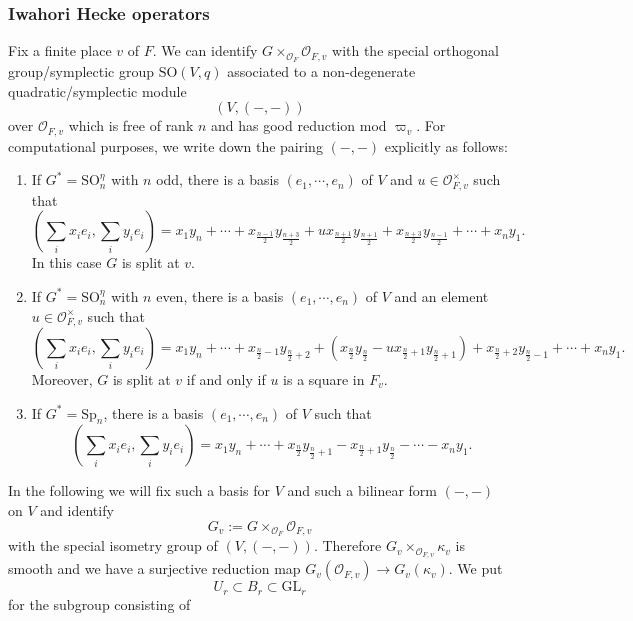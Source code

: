 \documentclass[12pt,oneside,reqno]{amsart}
\theoremstyle{plain}
\begin{document}
	\subsubsection{Iwahori Hecke operators}
	Fix a finite place $v$ of $F$.
	We can identify
	$G\times_{\mathcal{O}_F}\mathcal{O}_{F,v}$
	with the special orthogonal group/symplectic group
	$\mathrm{SO}(V,q)$
	associated to a non-degenerate quadratic/symplectic module
	\[
	(V,(-,-))
	\]
	over
	$\mathcal{O}_{F,v}$ which is free of rank $n$
	and has good reduction mod
	$\varpi_v$.
	For computational purposes,
	we write down the pairing
	$(-,-)$ explicitly as follows:
	\begin{enumerate}
		\item 
		If $G^\ast=\mathrm{SO}_n^\eta$ with $n$ odd,
		there is a basis
		$(e_1,\cdots,e_n)$
		of $V$ and $u\in\mathcal{O}_{F,v}^\times$ such that
		\[
		(\sum_ix_ie_i,\sum_iy_ie_i)
		=
		x_1y_n+\cdots+x_{\frac{n-1}{2}}y_{\frac{n+3}{2}}+ux_{\frac{n+1}{2}}y_{\frac{n+1}{2}}+x_{\frac{n+3}{2}}y_{\frac{n-1}{2}}+\cdots+x_ny_1.
		\]
		In this case
		$G$ is split at $v$.
		
		
		
		
		
		\item 
		If $G^\ast=\mathrm{SO}_n^\eta$ with $n$ even,
		there is a basis
		$(e_1,\cdots,e_n)$
		of $V$ and an element $u\in\mathcal{O}_{F,v}^\times$ such that
		\[
		(\sum_ix_ie_i,\sum_iy_ie_i)
		=
		x_1y_n+\cdots+x_{\frac{n}{2}-1}y_{\frac{n}{2}+2}+(x_{\frac{n}{2}}y_{\frac{n}{2}}-ux_{\frac{n}{2}+1}y_{\frac{n}{2}+1})+x_{\frac{n}{2}+2}y_{\frac{n}{2}-1}+\cdots+x_ny_1.
		\]
		Moreover, $G$ is split at $v$ if and only if $u$ is a square in $F_v$.
		
		
		
		\item 
		If $G^\ast=\mathrm{Sp}_n$, there is a basis $(e_1,\cdots,e_n)$ of $V$ such that
		\[
		(\sum_ix_ie_i,\sum_iy_ie_i)
		=
		x_1y_n+\cdots+x_{\frac{n}{2}}y_{\frac{n}{2}+1}-x_{\frac{n}{2}+1}y_{\frac{n}{2}}-\cdots-x_ny_1.
		\]
	\end{enumerate}
	In the following
	we will fix such a basis for $V$
	and such a bilinear form $(-,-)$ on $V$
	and identify
	\[
	G_v
	:=
	G\times_{\mathcal{O}_F}\mathcal{O}_{F,v}
	\]
	with the special isometry group of $(V,(-,-))$.
	Therefore
	$G_v\times_{\mathcal{O}_{F,v}}\kappa_v$
	is smooth and we have a surjective reduction map
	$G_v(\mathcal{O}_{F,v})
	\rightarrow
	G_v(\kappa_v)$.
	We put
	\[
	U_r
	\subset
	B_r
	\subset
	\mathrm{GL}_r
	\]
	for the subgroup
	consisting of
\end{document}
